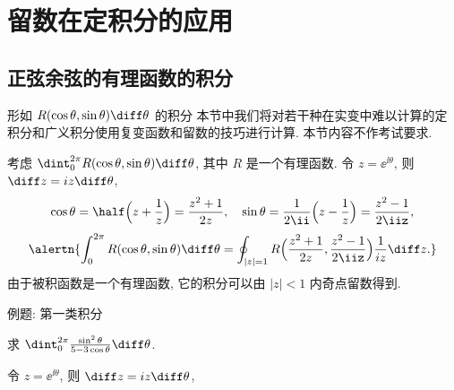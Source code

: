 \section{留数在定积分的应用}

\subsection{正弦余弦的有理函数的积分}

\begin{frame}{形如 $R(\cos\theta,\sin\theta)\diff\theta$ 的积分\noexer}
	\onslide<+->
	本节中我们将对若干种在实变中难以计算的定积分和广义积分使用复变函数和留数的技巧进行计算.
	\onslide<+->
	本节内容不作考试要求.

	\onslide<+->
	考虑 $\dint_0^{2\pi} R(\cos\theta,\sin\theta)\diff\theta$, 其中 $R$ 是一个有理函数.
	\onslide<+->
	令 $z=\ee^{\ii\theta}$, 则 $\diff z=iz\diff\theta$,
	\onslide<+->
	\[\cos\theta=\half\Bigl(z+\frac1z\Bigr)=\frac{z^2+1}{2z},\quad
	\sin\theta=\frac1{2\ii}\Bigl(z-\frac1z\Bigr)=\frac{z^2-1}{2\iiz},
	\]
	\onslide<+->
	\[\alertn{\int_0^{2\pi} R(\cos\theta,\sin\theta)\diff\theta=\oint_{|z|=1}R\Bigl(\frac{z^2+1}{2z},\frac{z^2-1}{2\iiz}\Bigr)\frac1{iz}\diff z.}
	\]
	\onslide<+->
	由于被积函数是一个有理函数, 它的积分可以由 $|z|<1$ 内奇点留数得到.
\end{frame}


\begin{frame}{例题: 第一类积分\noexer}\small
	\beqskip{1pt}
	\onslide<+->
	\begin{example}
		求 $\dint_0^{2\pi}\frac{\sin^2\theta}{5-3\cos\theta}\diff\theta$.
	\end{example}

	\onslide<+->
	\begin{solution}
		令 $z=\ee^{\ii\theta}$, 则 $\diff z=iz\diff\theta$,
		\onslide<+->{
			\[\cos\theta=\half\Bigl(z+\frac1z\Bigr)=\frac{z^2+1}{2z},\qquad
			\sin\theta=\frac1{2\ii}\Bigl(z-\frac1z\Bigr)=\frac{z^2-1}{2\iiz},
	\]
		}\onslide<+->{
			\[
				\int_0^{2\pi}\frac{\sin^2\theta}{5-3\cos\theta}\diff\theta
				=\oint_{|z|=1}\frac{(z^2-1)^2}{-4z^2}\cdot\frac1{5-3\dfrac{z^2+1}{2z}}\cdot\frac{\diff z}{iz}
				=-\frac i6\oint_{|z|=1}\frac{(z^2-1)^2}{z^2(z-3)(z-\dfrac13)}\diff z.
	\]
		}\onslide<+->{%
			则
			$\Res[f(z),0]=\dfrac{10}3, \Res[f(z),\dfrac13]=-\dfrac83$,
		}
		\onslide<+->{
			\[
				\int_0^{2\pi}\frac{\sin^2\theta}{5-3\cos\theta}\diff\theta
				=-\frac i6\cdot 2\pi\ii\Bigl[\Res[f(z),0]+\Res[f(z),\frac13]\Bigr]
				=\frac{2\pi}9.
	\]
		}
		\vspace{-.5\baselineskip}
	\end{solution}
	\endgroup
\end{frame}

